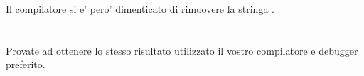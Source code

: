 

Il compilatore si e' pero' dimenticato di rimuovere la stringa .


\section{\Exercise}


Provate ad ottenere lo stesso risultato utilizzato il vostro compilatore e debugger preferito.

